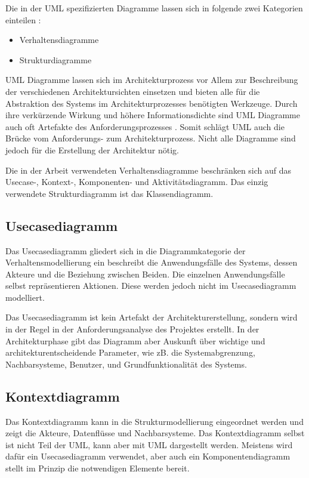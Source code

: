Die in der UML spezifizierten Diagramme lassen sich in folgende zwei Kategorien einteilen \cite[S. 105, 239]{glasklar}\cite[S. 146]{basiswissen}:

\begin{itemize}
  \item Verhaltensdiagramme
  \item Strukturdiagramme
\end{itemize}

UML Diagramme lassen sich im Architekturprozess vor Allem zur Beschreibung der verschiedenen Architektursichten einsetzen und bieten alle für die Abstraktion des Systems im Architekturprozesses benötigten Werkzeuge\cite[S. 139]{effektiv}. Durch ihre verkürzende Wirkung und höhere Informationsdichte sind UML Diagramme auch oft Artefakte des Anforderungsprozesses \cite[S. 215]{reqman}. Somit schlägt UML auch die Brücke vom Anforderungs- zum Architekturprozess. Nicht alle Diagramme sind jedoch für die Erstellung der Architektur nötig. \cite[S. 144]{basiswissen}

Die in der Arbeit verwendeten Verhaltensdiagramme beschränken sich auf das Usecase-, Kontext-, Komponenten- und Aktivitätsdiagramm. Das einzig verwendete Strukturdiagramm ist das Klassendiagramm.


\subsection{Usecasediagramm}
Das Usecasediagramm gliedert sich in die Diagrammkategorie der Verhaltensmodellierung ein beschreibt die Anwendungsfälle des Systems, dessen Akteure und die Beziehung zwischen Beiden. Die einzelnen Anwendungsfälle selbst repräsentieren Aktionen. Diese werden jedoch nicht im Usecasediagramm modelliert.\cite[S. 242-245]{glasklar}

Das Usecasediagramm ist kein Artefakt der Architekturerstellung, sondern wird in der Regel in der Anforderungsanalyse des Projektes erstellt. In der Architekturphase gibt das Diagramm aber Auskunft über wichtige und architekturentscheidende Parameter, wie zB. die Systemabgrenzung, Nachbarsysteme, Benutzer, und Grundfunktionalität des Systems. \cite[S. 148]{basiswissen}

\subsection{Kontextdiagramm}
Das Kontextdiagramm kann in die Strukturmodellierung eingeordnet werden und zeigt die Akteure, Datenflüsse und Nachbarsysteme. Das Kontextdiagramm selbst ist nicht Teil der UML, kann aber mit UML dargestellt werden. Meistens wird dafür ein Usecasediagramm verwendet, aber auch ein Komponentendiagramm stellt im Prinzip die notwendigen Elemente bereit. \cite[S. 255]{glasklar}

